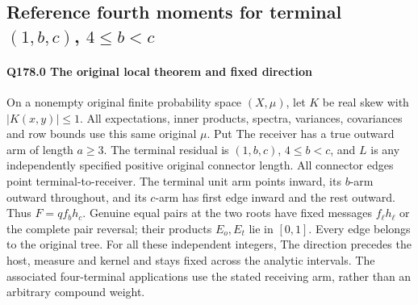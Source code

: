 \subsection{Reference fourth moments for terminal $(1,\allowbreak b,\allowbreak c)$, $4\le\allowbreak  b<\allowbreak c$}\label{proof:Q5-C178}
\paragraph{Q178.0 The original local theorem and fixed direction}\label{part:Q178.0}
On a nonempty original finite probability space $(X,\allowbreak \mu)$, let $K$ be
real skew with $|K(x,\allowbreak y)|\le\allowbreak 1$. All expectations, inner products, spectra,
variances, covariances and row bounds use this same original $\mu$.
Put
The receiver has a true outward arm of length $a\ge\allowbreak 3$.
The terminal residual is $(1,\allowbreak b,\allowbreak c)$, $4\le\allowbreak  b<\allowbreak c$, and $L$ is any
independently specified positive original connector length.
All connector edges point terminal-to-receiver. The terminal unit arm
points inward, its $b$-arm outward throughout, and its $c$-arm has first
edge inward and the rest outward. Thus $F=\allowbreak qf_bh_c$.
Genuine equal pairs at the two roots have fixed messages $f_\ell h_\ell$
or the complete pair reversal; their products $E_o,\allowbreak E_t$ lie in $[0,\allowbreak 1]$.
Every edge belongs to the original tree. For all these independent integers,
The direction precedes the host, measure and kernel and stays fixed
across the analytic intervals. The associated four-terminal applications
use the stated receiving arm, rather than an arbitrary compound weight.

